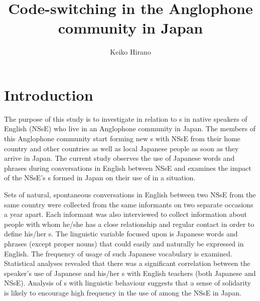 \documentclass[output=paper]{LSP/langsci}
\author{Keiko Hirano\affiliation{University of Kitakyushu, Japan}}
\title{Code-switching in the Anglophone community in Japan}
\begin{document}
   

 
\section{Introduction}
The purpose of this study is to investigate  in relation to s in native speakers of English (NSsE) who live in an Anglophone community in Japan. The members of this Anglophone community start forming new s with NSsE from their home country and other countries as well as local Japanese people as soon as they arrive in Japan. The current study observes the use of Japanese words and phrases during conversations in English between NSsE and examines the impact of the NSsE’s s formed in Japan on their use of  in a  situation.

Sets of natural, spontaneous conversations in English between two NSsE from the same country were collected from the same informants on two separate occasions a year apart. Each informant was also interviewed to collect information about people with whom he/she has a close relationship and regular contact in order to define his/her s. The linguistic variable focused upon is Japanese words and phrases (except proper nouns) that could easily and naturally be expressed in English. The frequency of usage of such Japanese vocabulary is examined. Statistical analyses revealed that there was a significant correlation between the speaker’s use of Japanese and his/her s with English teachers (both Japanese and NSsE). Analysis of s with linguistic behaviour suggests that a sense of solidarity is likely to encourage high frequency in the use of  among the NSsE in Japan.
\end{document}
